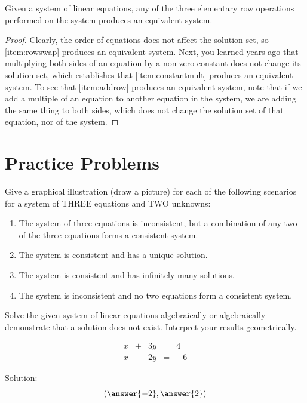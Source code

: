 \documentclass{ximera}
\begin{document}
\begin{theorem}\label{th:elemRowOpsEquivSys}
    Given a system of linear equations, any of the three elementary row operations performed on the system produces an equivalent system.
\end{theorem}
\begin{proof} Clearly, the order of equations does not affect the solution set, so \ref{item:rowswap} produces an equivalent system.  Next, you learned years ago that multiplying both sides of an equation by a non-zero constant does not change its solution set, which establishes that \ref{item:constantmult} produces an equivalent system.  To see that \ref{item:addrow} produces an equivalent system, note that if we add a multiple of an equation to another equation in the system, we are adding the same thing to both sides, which does not change the solution set of that equation, nor of the system.
\end{proof}



\section*{Practice Problems}
\begin{problem}\label{prob:sysgraphillustration}
Give a graphical illustration (draw a picture) for each of the following scenarios for a system of THREE equations and TWO unknowns:
  \begin{enumerate}
  \item The system of three equations is inconsistent, but a combination of any two of the three equations forms a consistent system.
  \item The system is consistent and has a unique solution.
  \item The system is consistent and has infinitely many solutions.
  \item The system is inconsistent and no two equations form a consistent system.
  \end{enumerate}
\end{problem}


  \begin{problem}\label{prob:solvesys1}
Solve the given system of linear equations algebraically or algebraically demonstrate that a solution does not exist.  Interpret your results geometrically.
  
  $$\begin{array}{ccccc}
      x & +&3y&= &4 \\
	 x& -&2y&=&-6
    \end{array}$$
    
    Solution: $$(\answer{-2},\answer{2})$$
  \end{problem}
  
\end{document}
